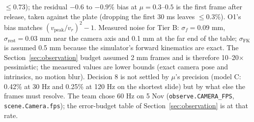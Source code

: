 \documentclass[10pt]{article}
\newcommand{\code}[1]{\texttt{#1}}
\begin{document}
$\le 0.73$); the residual $-0.6$ to $-0.9\%$ bias at $\mu = 0.3$--$0.5$ is the first frame after release, taken against the plate
(dropping the first 30 ms leaves $\le 0.3\%$).  O1's bias matches $(v_{\mathrm{peak}}/v_r)^2 - 1$.  Measured noise for Tier B:
$\sigma_f = 0.09$ mm, $\sigma_{\mathrm{rest}} = 0.03$ mm near the camera axis and 0.1 mm at the far end of the table; $\sigma_{\mathrm{FK}}$ is
assumed 0.5 mm because the simulator's forward kinematics are exact.  The Section~\ref{sec:observation} budget assumed 2 mm frames and
is therefore 10--20$\times$ pessimistic; the measured values are lower bounds (exact camera pose and intrinsics, no motion blur).
Decision 8 is not settled by $\mu$'s precision (model C: 0.42\% at 30 Hz and 0.25\% at 120 Hz on the shortest slide) but by what
else the frames must resolve.  The team chose 60 Hz on 5 Nov (\code{observe.CAMERA\_FPS}, \code{scene.Camera.fps}); the
error-budget table of Section~\ref{sec:observation} is at that rate.

\appendix
\end{document}

